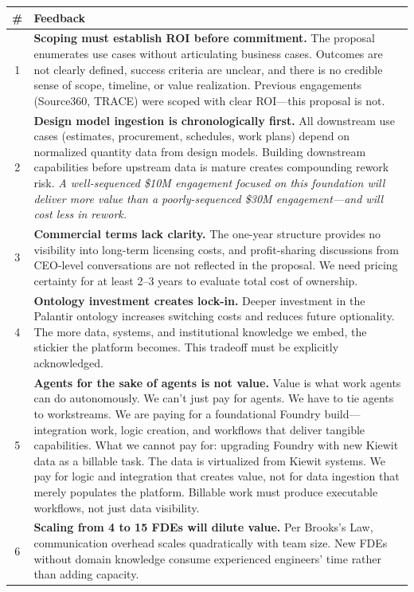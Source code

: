 \documentclass[11pt, letterpaper]{article}
\begin{document}
{\footnotesize
\renewcommand{\arraystretch}{1.2}
\begin{tabular}{@{}c p{}@{}}
\toprule
\textbf{\#} & \textbf{Feedback} \\
\midrule
1 & \textbf{Scoping must establish ROI before commitment.} The proposal enumerates use cases without articulating business cases. Outcomes are not clearly defined, success criteria are unclear, and there is no credible sense of scope, timeline, or value realization. Previous engagements (Source360, TRACE) were scoped with clear ROI---this proposal is not. \\
\midrule
2 & \textbf{Design model ingestion is chronologically first.} All downstream use cases (estimates, procurement, schedules, work plans) depend on normalized quantity data from design models. Building downstream capabilities before upstream data is mature creates compounding rework risk. \textit{A well-sequenced \$10M engagement focused on this foundation will deliver more value than a poorly-sequenced \$30M engagement---and will cost less in rework.} \\
\midrule
3 & \textbf{Commercial terms lack clarity.} The one-year structure provides no visibility into long-term licensing costs, and profit-sharing discussions from CEO-level conversations are not reflected in the proposal. We need pricing certainty for at least 2--3 years to evaluate total cost of ownership. \\
\midrule
4 & \textbf{Ontology investment creates lock-in.} Deeper investment in the Palantir ontology increases switching costs and reduces future optionality. The more data, systems, and institutional knowledge we embed, the stickier the platform becomes. This tradeoff must be explicitly acknowledged. \\
\midrule
5 & \textbf{Agents for the sake of agents is not value.} Value is what work agents can do autonomously. We can't just pay for agents. We have to tie agents to workstreams. We are paying for a foundational Foundry build---integration work, logic creation, and workflows that deliver tangible capabilities. What we cannot pay for: upgrading Foundry with new Kiewit data as a billable task. The data is virtualized from Kiewit systems. We pay for logic and integration that creates value, not for data ingestion that merely populates the platform. Billable work must produce executable workflows, not just data visibility. \\
\midrule
6 & \textbf{Scaling from 4 to 15 FDEs will dilute value.} Per Brooks's Law, communication overhead scales quadratically with team size. New FDEs without domain knowledge consume experienced engineers' time rather than adding capacity. \\

\end{tabular}}
\end{document}
